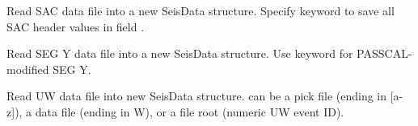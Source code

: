 \documentclass[letterpaper,11pt,english]{sphinxmanual}
\begin{document}
\begin{fulllineitems}
\label{\detokenize{src/Formats/fileformats:readsac}}
\end{fulllineitems}


\begin{fulllineitems}
\label{\detokenize{src/Formats/fileformats:rsac}}
\end{fulllineitems}


Read SAC data file  into a new SeisData structure. Specify keyword  to save all SAC header values in field .

\begin{fulllineitems}
\label{\detokenize{src/Formats/fileformats:readsegy}}
\end{fulllineitems}


Read SEG Y data file  into a new SeisData structure. Use keyword  for PASSCAL-modified SEG Y.

\begin{fulllineitems}
\label{\detokenize{src/Formats/fileformats:readuw}}
\end{fulllineitems}


Read UW data file into new SeisData structure.  can be a pick file (ending in {[}a-z{]}), a data file (ending in W), or a file root (numeric UW event ID).

\begin{fulllineitems}
\label{\detokenize{src/Formats/fileformats:readwin32}}
\end{fulllineitems}
\end{document}
